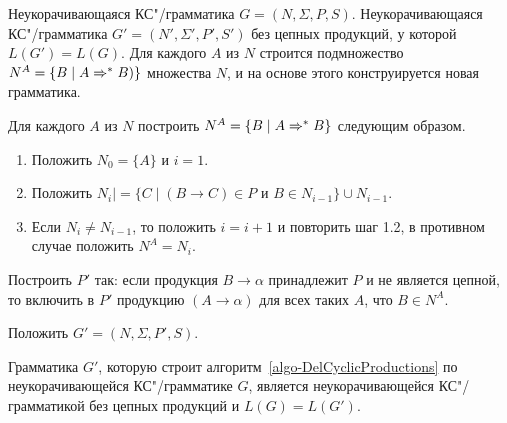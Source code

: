 {\label{algo-DelCyclicProductions}Неукорачивающаяся КС"/грамматика $G=(N,\Sigma,P,S)$.}
{Неукорачивающаяся КС"/грамматика $G'=(N',\Sigma',P',S')$ без цепных продукций, у которой $L(G')=L(G)$.}
{Для каждого $A$ из $N$ строится подмножество $N^A=\{B\mid A\Rightarrow^*B)\}$ множества $N$, и на основе этого конструируется новая грамматика.}
{
\item
Для каждого $A$ из $N$ построить $N^A=\{B\mid A\Rightarrow^*B\}$ следующим образом.
\begin{enumerate}[leftmargin=1cm]
\item Положить $N_0=\{A\}$ и $i=1$.

\item Положить $N_i|=\{C\mid (B\to C)\in P$ и $B\in N_{i-1}\}\cup N_{i-1}$.

\item Если $N_i\neq N_{i-1}$, то положить $i=i+1$ и повторить шаг 1.2, в противном случае положить $N^A=N_i$.
\end{enumerate}

\item
Построить $P'$ так: если продукция $B\to\alpha$ принадлежит $P$ и не является цепной, то включить в $P'$ продукцию $(A\to\alpha)$ для всех таких $A$, что $B\in N^A$.

\item
Положить $G'=(N,\Sigma,P',S)$.
}
\begin{mytheorem}
\label{theorem-AlgoDelEpsProductionsCorrectnessWOEpsProducts}
Грамматика $G'$, которую строит алгоритм~\ref{algo-DelCyclicProductions} по неукорачивающейся КС"/грамматике $G$, является неукорачивающейся КС"/грамматикой без цепных продукций и $L(G)=L(G')$.
\end{mytheorem}

